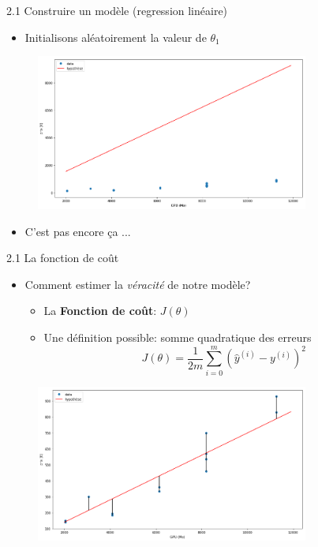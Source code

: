 \begin{frame}{2.1 Construire un modèle (regression linéaire)}
  \begin{itemize}
  \item Initialisons aléatoirement la valeur de $\theta_{1}$
  \end{itemize}
  \vspace{-0.5cm}
  \begin{figure}
    \includegraphics[width=0.8\textwidth]{fig/model.png}
  \end{figure}
  \vspace{-0.5cm}
  \begin{itemize}
  \item C'est pas encore ça ...
  \end{itemize}
\end{frame}

\begin{frame}{2.1 La fonction de coût}
  \begin{itemize}
  \item Comment estimer la \textit{véracité} de notre modèle?
    \begin{itemize}
    \item La \textbf{Fonction de coût}: $J(\theta)$
      \vspace{0.15cm}
    \item Une définition possible: somme quadratique des erreurs
      \begin{equation*}
        J(\theta) = \frac{1}{2m} \displaystyle\sum_{i=0}^{m}(\hat{y}^{(i)} - y^{(i)})^{2}
      \end{equation*}
    \end{itemize}
  \end{itemize}
  \vspace{-0.5cm}
  \begin{figure}
    \includegraphics[width=0.8\textwidth]{fig/modelEstimation.png}
  \end{figure}  
\end{frame}

